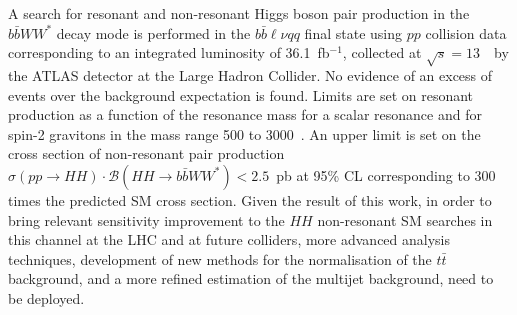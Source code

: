 A search for  resonant and non-resonant Higgs boson pair production in
the $b\bar{b}WW^\ast$ decay mode is performed in the $b\bar{b}\ell\nu qq$
final state using $pp$ collision data corresponding to an integrated
luminosity of 36.1~fb$^{-1}$, collected at $\sqrt{s}=13$~\TeV\ by the
ATLAS detector at the Large Hadron Collider. No evidence of an excess of events
over the background expectation is found.
Limits are set on resonant production as a function of the resonance mass for a scalar resonance and for
spin-2 gravitons in the mass range 500 to 3000~\GeV.
An upper limit is set on the cross section of non-resonant pair production
$\sigma(pp \to HH) \cdot {\mathcal{B}}(HH \to b\bar{b}WW^{\ast}) < 2.5$~pb
at 95\% CL corresponding to  300 times the predicted SM cross
section. Given the result of this work, in order to bring
relevant sensitivity improvement to the $HH$ non-resonant SM searches
in this channel at the LHC and at future colliders, more advanced analysis techniques,
development of new methods for the normalisation of the $t\bar{t}$
background, and a more refined estimation of the multijet background, need to be deployed.
 
 
 